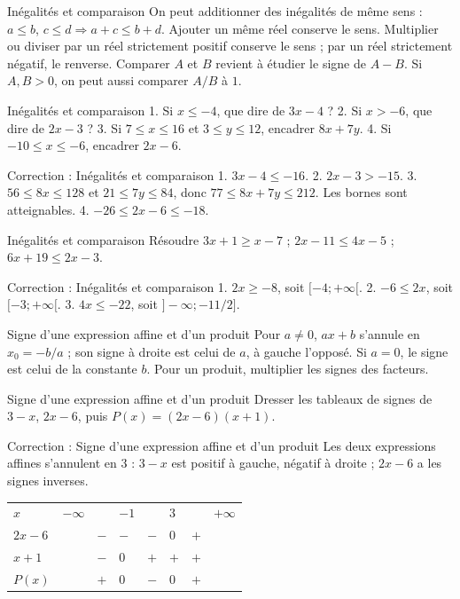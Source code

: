 \documentclass[aspectratio=169,10pt]{beamer}
\begin{document}
\begin{frame}{Inégalités et comparaison}
On peut additionner des inégalités de même sens : \(a\leq b\), \(c\leq d\Rightarrow a+c\leq b+d\). Ajouter un même réel conserve le sens. Multiplier ou diviser par un réel strictement positif conserve le sens ; par un réel strictement négatif, le renverse.
Comparer \(A\) et \(B\) revient à étudier le signe de \(A-B\). Si \(A,B>0\), on peut aussi comparer \(A/B\) à \(1\).
\end{frame}
\begin{frame}{Inégalités et comparaison}
1. Si \(x\leq-4\), que dire de \(3x-4\) ? 2. Si \(x>-6\), que dire de \(2x-3\) ? 3. Si \(7\leq x\leq16\) et \(3\leq y\leq12\), encadrer \(8x+7y\). 4. Si \(-10\leq x\leq-6\), encadrer \(2x-6\).
\end{frame}
\begin{frame}{Correction : Inégalités et comparaison}
1. \(3x-4\leq-16\). 2. \(2x-3>-15\). 3. \(56\leq8x\leq128\) et \(21\leq7y\leq84\), donc \(77\leq8x+7y\leq212\). Les bornes sont atteignables. 4. \(-26\leq2x-6\leq-18\).
\end{frame}
\begin{frame}{Inégalités et comparaison}
Résoudre \(3x+1\geq x-7\) ; \(2x-11\leq4x-5\) ; \(6x+19\leq2x-3\).
\end{frame}
\begin{frame}{Correction : Inégalités et comparaison}
1. \(2x\geq-8\), soit \([-4;+\infty[\). 2. \(-6\leq2x\), soit \([-3;+\infty[\). 3. \(4x\leq-22\), soit \(]-\infty;-11/2]\).
\end{frame}
\begin{frame}{Signe d'une expression affine et d'un produit}
Pour \(a\ne0\), \(ax+b\) s'annule en \(x_0=-b/a\) ; son signe à droite est celui de \(a\), à gauche l'opposé. Si \(a=0\), le signe est celui de la constante \(b\). Pour un produit, multiplier les signes des facteurs.
\end{frame}
\begin{frame}{Signe d'une expression affine et d'un produit}
Dresser les tableaux de signes de \(3-x\), \(2x-6\), puis \(P(x)=(2x-6)(x+1)\).
\end{frame}
\begin{frame}{Correction : Signe d'une expression affine et d'un produit}
Les deux expressions affines s'annulent en \(3\) : \(3-x\) est positif à gauche, négatif à droite ; \(2x-6\) a les signes inverses.
  \begin{center}\begin{tabular}{llllllll}
\(x\) & \(-\infty\) &  & \(-1\) &  & \(3\) &  & \(+\infty\) \\ 
\(2x-6\) &  & \(-\) & \(-\) & \(-\) & \(0\) & \(+\) &  \\ 
\(x+1\) &  & \(-\) & \(0\) & \(+\) & \(+\) & \(+\) &  \\ 
\(P(x)\) &  & \(+\) & \(0\) & \(-\) & \(0\) & \(+\) &  \\ 
\end{tabular}\end{center}
\end{frame}
\end{document}
